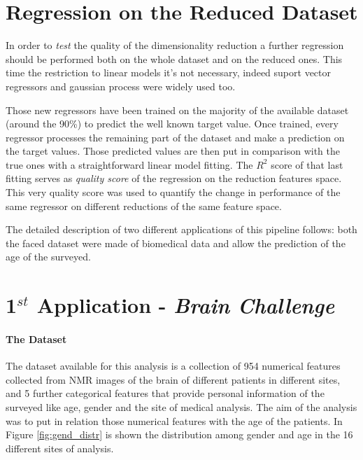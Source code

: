 \documentclass{article}
\begin{document}
\section*{Regression on the Reduced Dataset}
In order to \emph{test} the quality of the dimensionality reduction a further regression should be performed both on the whole dataset and on the reduced ones. This time the restriction to linear models it's not necessary, indeed suport vector regressors and gaussian process were widely used too.

Those new regressors have been trained on the majority of the available dataset (around the 90\%) to predict the well known target value. Once trained, every regressor processes the remaining part of the dataset and make a prediction on the target values. Those predicted values are then put in comparison with the true ones with a straightforward linear model fitting. The $R^2$ score of that last fitting serves as \emph{quality score} of the regression on the reduction features space. This very quality score was used to quantify the change in performance of the same regressor on different reductions of the same feature space.

The detailed description of two different applications of this pipeline follows: both the faced dataset were made of biomedical data and allow the prediction of the age of the surveyed.



\section*{1$^{st}$ Application - \emph{Brain Challenge}}
\paragraph{The Dataset}
The dataset available for this analysis is a collection of 954 numerical features collected from NMR images of the brain of different patients in different sites, and 5 further categorical features that provide personal information of the surveyed like age, gender and the site of medical analysis. The aim of the analysis was to put in relation those numerical features with the age of the patients. In Figure \ref{fig:gend_distr} is shown the distribution among gender and age in the 16 different sites of analysis.
\end{document}
